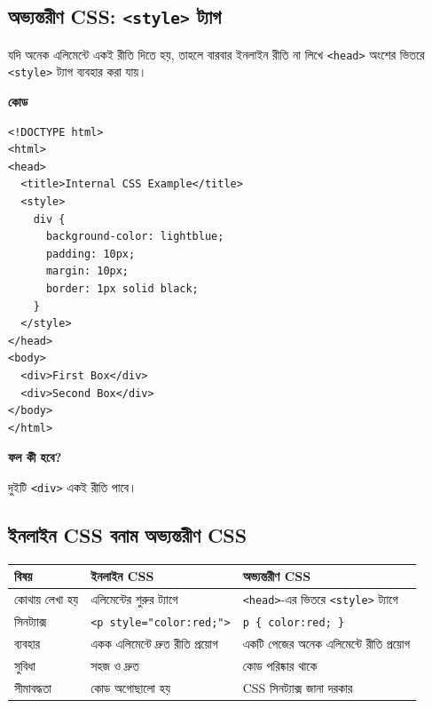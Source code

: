 \subsection{অভ্যন্তরীণ CSS: \texttt{<style>} ট্যাগ}

যদি অনেক এলিমেন্টে একই রীতি দিতে হয়, তাহলে বারবার ইনলাইন রীতি না লিখে \texttt{<head>} অংশের ভিতরে \texttt{<style>} ট্যাগ ব্যবহার করা যায়।

\par\noindent
\begin{minipage}[t]{.50\linewidth}\vspace{0pt}\small
\textbf{\color{chFourTeal}কোড}\par
\par\noindent
\begin{verbatim}
<!DOCTYPE html>
<html>
<head>
  <title>Internal CSS Example</title>
  <style>
    div {
      background-color: lightblue;
      padding: 10px;
      margin: 10px;
      border: 1px solid black;
    }
  </style>
</head>
<body>
  <div>First Box</div>
  <div>Second Box</div>
</body>
</html>
\end{verbatim}
\par
\par\smallskip
\end{minipage}\hfill
\begin{minipage}[t]{.46\linewidth}\vspace{0pt}\small
\textbf{\color{chFourTeal}ফল কী হবে?}\par
দুইটি \texttt{<div>} একই রীতি পাবে।
\par\smallskip
\end{minipage}\par


\subsection{ইনলাইন CSS বনাম অভ্যন্তরীণ CSS}

\begin{center}
\begin{tabular}{|p{}|p{}|p{}|}
\hline
\textbf{বিষয়} & \textbf{ইনলাইন CSS} & \textbf{অভ্যন্তরীণ CSS} \\
\hline
কোথায় লেখা হয় & এলিমেন্টের শুরুর ট্যাগে & \texttt{<head>}-এর ভিতরে \texttt{<style>} ট্যাগে \\
\hline
সিনট্যাক্স & \texttt{<p style="color:red;">} & \texttt{p \{ color:red; \}} \\
\hline
ব্যবহার & একক এলিমেন্টে দ্রুত রীতি প্রয়োগ & একটি পেজের অনেক এলিমেন্টে রীতি প্রয়োগ \\
\hline
সুবিধা & সহজ ও দ্রুত & কোড পরিষ্কার থাকে \\
\hline
সীমাবদ্ধতা & কোড অগোছালো হয় & CSS সিনট্যাক্স জানা দরকার \\
\hline
\end{tabular}
\end{center}


